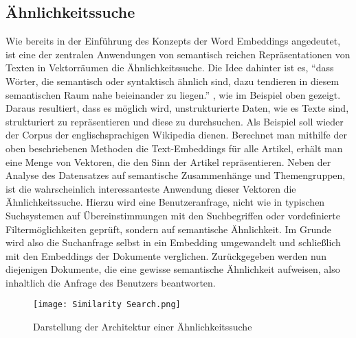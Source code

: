 \subsection{Ähnlichkeitssuche}
Wie bereits in der Einführung des Konzepts der Word Embeddings angedeutet, ist eine der zentralen Anwendungen von semantisch reichen Repräsentationen von Texten in Vektorräumen die Ähnlichkeitssuche. Die Idee dahinter ist es, ``dass Wörter, die semantisch oder syntaktisch ähnlich sind, dazu tendieren in diesem semantischen Raum nahe beieinander zu liegen.'' \parencite[S. 2, Übers. d. Verf.]{semantic_search}, wie im Beispiel oben gezeigt. Daraus resultiert, dass es möglich wird, unstrukturierte Daten, wie es Texte sind, strukturiert zu repräsentieren und diese zu durchsuchen. Als Beispiel soll wieder der Corpus der englischsprachigen Wikipedia dienen. Berechnet man mithilfe der oben beschriebenen Methoden die Text-Embeddings für alle Artikel, erhält man eine Menge von Vektoren, die den Sinn der Artikel repräsentieren. Neben der Analyse des Datensatzes auf semantische Zusammenhänge und Themengruppen, ist die wahrscheinlich interessanteste Anwendung dieser Vektoren die Ähnlichkeitssuche. Hierzu wird eine Benutzeranfrage, nicht wie in typischen Suchsystemen auf Übereinstimmungen mit den Suchbegriffen oder vordefinierte Filtermöglichkeiten geprüft, sondern auf semantische Ähnlichkeit. Im Grunde wird also die Suchanfrage selbst in ein Embedding umgewandelt und schließlich mit den Embeddings der Dokumente verglichen. Zurückgegeben werden nun diejenigen Dokumente, die eine gewisse semantische Ähnlichkeit aufweisen, also inhaltlich die Anfrage des Benutzers beantworten. \\

\begin{figure}[H]
    \centering
    \texttt{[image: Similarity Search.png]}
    \caption{Darstellung der Architektur einer Ähnlichkeitssuche}
    \label{SimilaritySearch}
\end{figure}

